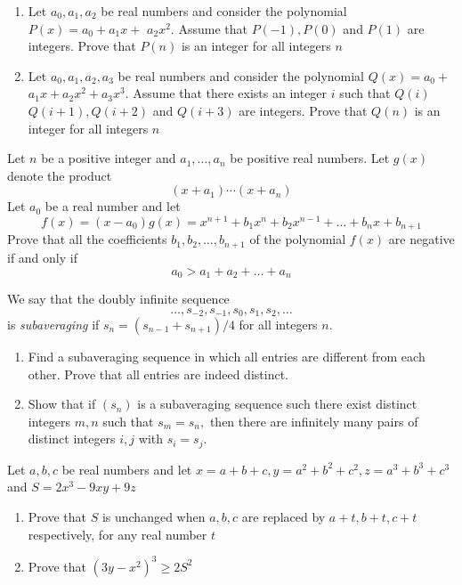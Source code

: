\documentclass{pset}
\begin{document}
\begin{problems}
\begin{problem}[IrMO 2014 Q8]
\begin{enumerate}
    \item Let \(a_{0}, a_{1}, a_{2}\) be real numbers and consider the polynomial \(P(x)=a_{0}+a_{1} x+\) \(a_{2} x^{2} .\) Assume that \(P(-1), P(0)\) and \(P(1)\) are integers. Prove that \(P(n)\) is an integer for all integers \(n\)
    \item Let \(a_{0}, a_{1}, a_{2}, a_{3}\) be real numbers and consider the polynomial \(Q(x)=a_{0}+\) \(a_{1} x+a_{2} x^{2}+a_{3} x^{3} .\) Assume that there exists an integer \(i\) such that \(Q(i)\) \(Q(i+1), Q(i+2)\) and \(Q(i+3)\) are integers. Prove that \(Q(n)\) is an integer for all integers \(n\)
\end{enumerate}
\end{problem}

\begin{problem}[IrMO 2014 Q9]
    Let \(n\) be a positive integer and \(a_{1}, \ldots, a_{n}\) be positive real numbers. Let \(g(x)\) denote the product
    $$
    \left(x+a_{1}\right) \cdots\left(x+a_{n}\right)
    $$
    Let \(a_{0}\) be a real number and let
    $$
    f(x)=\left(x-a_{0}\right) g(x)=x^{n+1}+b_{1} x^{n}+b_{2} x^{n-1}+\ldots+b_{n} x+b_{n+1}
    $$
    Prove that all the coefficients \(b_{1}, b_{2}, \ldots, b_{n+1}\) of the polynomial \(f(x)\) are negative if and only if
    $$
    a_{0}>a_{1}+a_{2}+\ldots+a_{n}
    $$
\end{problem}

\begin{problem}[IrMO 2013 Q9]
We say that the doubly infinite sequence
$$
\dots, s_{-2}, s_{-1}, s_0, s_1, s_2, \dots
$$
is \emph{subaveraging} if $s_n = (s_{n - 1} + s_{n + 1})/4$ for all integers $n$.
\begin{enumerate}
    \item Find a subaveraging sequence in which all entries are different from each other. Prove that all entries are indeed distinct.
    \item Show that if \(\left(s_{n}\right)\) is a subaveraging sequence such there exist distinct integers \(m, n\) such that \(s_{m}=s_{n},\) then there are infinitely many pairs of distinct integers \(i, j\) with \(s_{i}=s_{j}\).
\end{enumerate}
\end{problem}

\begin{problem}[IrMO 2013 Q10]
    Let \(a, b, c\) be real numbers and let \(x=a+b+c, y=a^{2}+b^{2}+c^{2}, z=a^{3}+b^{3}+c^{3}\) and \(S=2 x^{3}-9 x y+9 z\)
    \begin{enumerate}
        \item Prove that \(S\) is unchanged when \(a, b, c\) are replaced by \(a+t, b+t, c+t\) respectively, for any real number \(t\)
        \item Prove that \(\left(3 y-x^{2}\right)^{3} \geq 2 S^{2}\)
    \end{enumerate}
\end{problem}


\end{problems}
\end{document}
